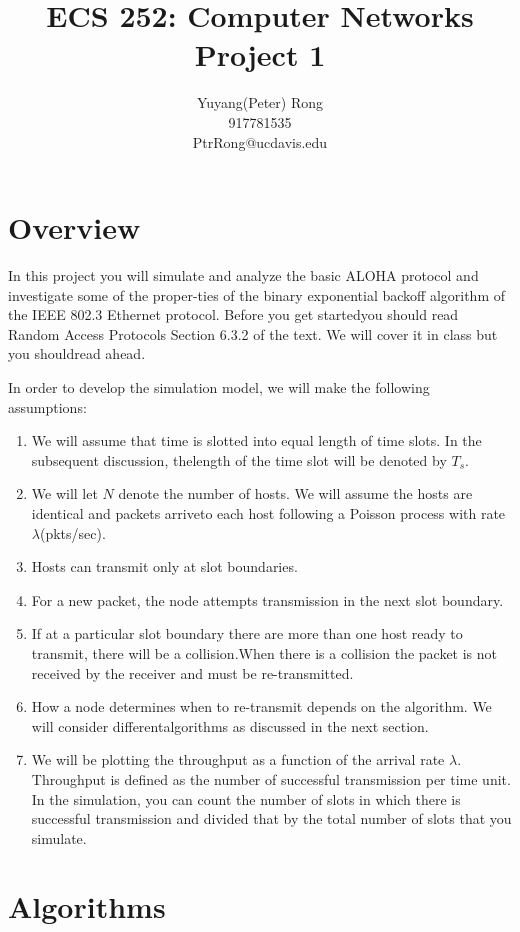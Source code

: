 \documentclass{article}
\title{ECS 252: Computer Networks \\ Project 1}
\author{Yuyang(Peter) Rong \\917781535 \\ PtrRong@ucdavis.edu}
\begin{document}
\maketitle

\section{Overview}

In this project you will simulate and analyze the basic ALOHA protocol and investigate some of the proper-ties of the binary exponential backoff algorithm of the IEEE 802.3 Ethernet protocol.
Before you get startedyou should read Random Access Protocols Section 6.3.2 of the text.
We will cover it in class but you shouldread ahead.

In order to develop the simulation model, we will make the following assumptions:

\begin{enumerate}
    \item We will assume that time is slotted into equal length of time slots.
          In the subsequent discussion, thelength of the time slot will be denoted by $T_s$.
    \item We will let $N$ denote the number of hosts.
          We will assume the hosts are identical and packets arriveto each host following a Poisson process with rate $\lambda$(pkts/sec).
    \item Hosts can transmit only at slot boundaries.
    \item For a new packet, the node attempts transmission in the next slot boundary.
    \item If at a particular slot boundary there are more than one host ready to transmit, there will be a collision.When there is a collision the packet is not received by the receiver and must be re-transmitted.
    \item How a node determines when to re-transmit depends on the algorithm.
          We will consider differentalgorithms as discussed in the next section.
    \item We will be plotting the throughput as a function of the arrival rate $\lambda$.
          Throughput is defined as the number of successful transmission per time unit.
          In the simulation, you can count the number of slots in which there is successful transmission and divided that by the total number of slots that you simulate.
\end{enumerate}

\section{Algorithms}
\end{document}

